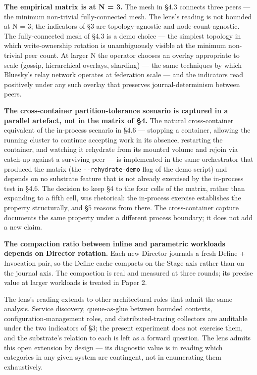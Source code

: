 \documentclass[
]{article}
\begin{document}
\textbf{The empirical matrix is at N = 3.} The mesh in §4.3 connects
three peers --- the minimum non-trivial fully-connected mesh. The lens's
reading is not bounded at N = 3; the indicators of §3 are
topology-agnostic and node-count-agnostic. The fully-connected mesh of
§4.3 is a demo choice --- the simplest topology in which write-ownership
rotation is unambiguously visible at the minimum non-trivial peer count.
At larger N the operator chooses an overlay appropriate to scale
(gossip, hierarchical overlays, sharding) --- the same techniques by
which Bluesky's relay network operates at federation scale --- and the
indicators read positively under any such overlay that preserves
journal-determinism between peers.

\textbf{The cross-container partition-tolerance scenario is captured in
a parallel artefact, not in the matrix of §4.} The natural
cross-container equivalent of the in-process scenario in §4.6 ---
stopping a container, allowing the running cluster to continue accepting
work in its absence, restarting the container, and watching it rehydrate
from its mounted volume and rejoin via catch-up against a surviving peer
--- is implemented in the same orchestrator that produced the matrix
(the \texttt{-\/-rehydrate-demo} flag of the demo script) and depends on
no substrate feature that is not already exercised by the in-process
test in §4.6. The decision to keep §4 to the four cells of the matrix,
rather than expanding to a fifth cell, was rhetorical: the in-process
exercise establishes the property structurally, and §5 reasons from
there. The cross-container capture documents the same property under a
different process boundary; it does not add a new claim.

\textbf{The compaction ratio between inline and parametric workloads
depends on Director rotation.} Each new Director journals a fresh Define
+ Invocation pair, so the Define cache compacts on the Stage axis rather
than on the journal axis. The compaction is real and measured at three
rounds; its precise value at larger workloads is treated in Paper 2.

The lens's reading extends to other architectural roles that admit the
same analysis. Service discovery, queue-as-glue between bounded
contexts, configuration-management roles, and distributed-tracing
collectors are auditable under the two indicators of §3; the present
experiment does not exercise them, and the substrate's relation to each
is left as a forward question. The lens admits this open extension by
design --- its diagnostic value is in reading which categories in any
given system are contingent, not in enumerating them exhaustively.
\end{document}
